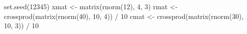 \documentclass[
  12pt,
  letterpaper,
  DIV=11,
  numbers=noendperiod]{scrartcl}
\newenvironment{Shaded}{\begin{snugshade}}{\end{snugshade}}
\newcommand{\DecValTok}[1]{\textcolor[rgb]{0.68,0.00,0.00}{#1}}
\newcommand{\FunctionTok}[1]{\textcolor[rgb]{0.28,0.35,0.67}{#1}}
\newcommand{\NormalTok}[1]{\textcolor[rgb]{0.00,0.23,0.31}{#1}}
\newcommand{\OtherTok}[1]{\textcolor[rgb]{0.00,0.23,0.31}{#1}}
\newcommand{\SpecialCharTok}[1]{\textcolor[rgb]{0.37,0.37,0.37}{#1}}
\begin{document}
\begin{Shaded}
\begin{Highlighting}[]
\FunctionTok{set.seed}\NormalTok{(}\DecValTok{12345}\NormalTok{)}
\NormalTok{xmat }\OtherTok{\textless{}{-}} \FunctionTok{matrix}\NormalTok{(}\FunctionTok{rnorm}\NormalTok{(}\DecValTok{12}\NormalTok{), }\DecValTok{4}\NormalTok{, }\DecValTok{3}\NormalTok{)}
\NormalTok{rmat }\OtherTok{\textless{}{-}} \FunctionTok{crossprod}\NormalTok{(}\FunctionTok{matrix}\NormalTok{(}\FunctionTok{rnorm}\NormalTok{(}\DecValTok{40}\NormalTok{), }\DecValTok{10}\NormalTok{, }\DecValTok{4}\NormalTok{)) }\SpecialCharTok{/} \DecValTok{10}
\NormalTok{cmat }\OtherTok{\textless{}{-}} \FunctionTok{crossprod}\NormalTok{(}\FunctionTok{matrix}\NormalTok{(}\FunctionTok{rnorm}\NormalTok{(}\DecValTok{30}\NormalTok{), }\DecValTok{10}\NormalTok{, }\DecValTok{3}\NormalTok{)) }\SpecialCharTok{/} \DecValTok{10}


\end{Highlighting}
\end{Shaded}
\end{document}
